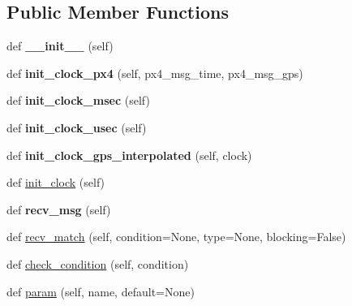 \subsection*{Public Member Functions}
\begin{DoxyCompactItemize}
\item 
\mbox{\label{classpymavlink_1_1DFReader_1_1DFReader_a61e0dac0ea04b561026a7430a4151e4d}} 
def {\bfseries \+\_\+\+\_\+init\+\_\+\+\_\+} (self)
\item 
\mbox{\label{classpymavlink_1_1DFReader_1_1DFReader_a5c00e009f191c36057548ab1ec7c55c6}} 
def {\bfseries init\+\_\+clock\+\_\+px4} (self, px4\+\_\+msg\+\_\+time, px4\+\_\+msg\+\_\+gps)
\item 
\mbox{\label{classpymavlink_1_1DFReader_1_1DFReader_a7024dae05e22c20921859c26202e4c2c}} 
def {\bfseries init\+\_\+clock\+\_\+msec} (self)
\item 
\mbox{\label{classpymavlink_1_1DFReader_1_1DFReader_ab8d8991c0b0a08c78280a368c79fbd1c}} 
def {\bfseries init\+\_\+clock\+\_\+usec} (self)
\item 
\mbox{\label{classpymavlink_1_1DFReader_1_1DFReader_afb024cca6810c36c6cb2164c35e25ef7}} 
def {\bfseries init\+\_\+clock\+\_\+gps\+\_\+interpolated} (self, clock)
\item 
def \hyperlink{classpymavlink_1_1DFReader_1_1DFReader_ac2bc47ae655fa152f8e434470731cbda}{init\+\_\+clock} (self)
\item 
\mbox{\label{classpymavlink_1_1DFReader_1_1DFReader_a7c726e75615d8cc5b2a65fe62ab2f21d}} 
def {\bfseries recv\+\_\+msg} (self)
\item 
def \hyperlink{classpymavlink_1_1DFReader_1_1DFReader_aa0900449adff0ff0946cc568f83308ed}{recv\+\_\+match} (self, condition=None, type=None, blocking=False)
\item 
def \hyperlink{classpymavlink_1_1DFReader_1_1DFReader_a793c18e4b164a17f7088a0cec9a647d5}{check\+\_\+condition} (self, condition)
\item 
def \hyperlink{classpymavlink_1_1DFReader_1_1DFReader_a610321cdac70a9229612b42efc1f1dd0}{param} (self, name, default=None)
\end{DoxyCompactItemize}
